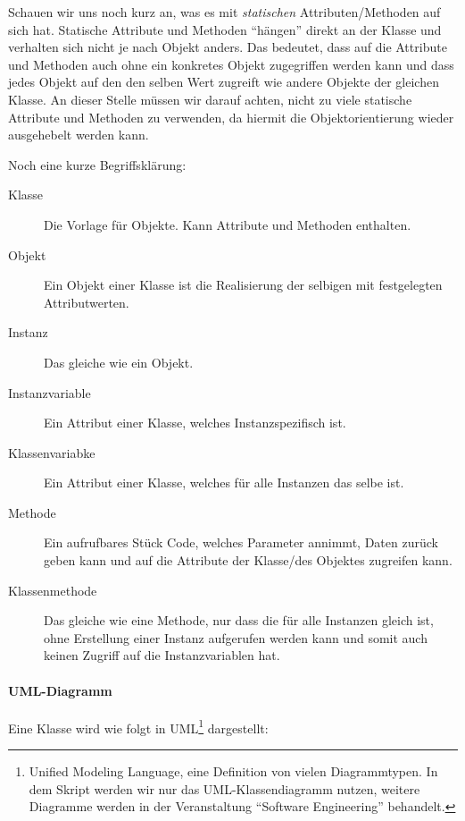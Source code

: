 	Schauen wir uns noch kurz an, was es mit \textit{statischen} Attributen/Methoden auf sich hat. Statische Attribute und Methoden \enquote{hängen} direkt an der Klasse und verhalten sich nicht je nach Objekt anders. Das bedeutet, dass auf die Attribute und Methoden auch ohne ein konkretes Objekt zugegriffen werden kann und dass jedes Objekt auf den den selben Wert zugreift wie andere Objekte der gleichen Klasse. An dieser Stelle müssen wir darauf achten, nicht zu viele statische Attribute und Methoden zu verwenden, da hiermit die Objektorientierung wieder ausgehebelt werden kann.
	
	Noch eine kurze Begriffsklärung:
	\begin{description}
		\item[Klasse] Die Vorlage für Objekte. Kann Attribute und Methoden enthalten.
		\item[Objekt] Ein Objekt einer Klasse ist die Realisierung der selbigen mit festgelegten Attributwerten.
		\item[Instanz] Das gleiche wie ein Objekt.
		\item[Instanzvariable] Ein Attribut einer Klasse, welches Instanzspezifisch ist.
		\item[Klassenvariabke] Ein Attribut einer Klasse, welches für alle Instanzen das selbe ist.
		\item[Methode] Ein aufrufbares Stück Code, welches Parameter annimmt, Daten zurück geben kann und auf die Attribute der Klasse/des Objektes zugreifen kann.
		\item[Klassenmethode] Das gleiche wie eine Methode, nur dass die für alle Instanzen gleich ist, ohne Erstellung einer Instanz aufgerufen werden kann und somit auch keinen Zugriff auf die Instanzvariablen hat.
	\end{description}

	\paragraph{UML-Diagramm}
		Eine Klasse wird wie folgt in UML\footnote{Unified Modeling Language, eine Definition von vielen Diagrammtypen. In dem Skript werden wir nur das UML-Klassendiagramm nutzen, weitere Diagramme werden in der Veranstaltung \enquote{Software Engineering} behandelt.} dargestellt:
		\begin{figure}[H]
			\centering
		\end{figure}

